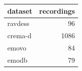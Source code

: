 \begin{tabular}{lr}
\toprule
dataset & recordings \\
\midrule
ravdess & 96 \\
crema-d & 1086 \\
emovo & 84 \\
emodb & 79 \\
\bottomrule
\end{tabular}
